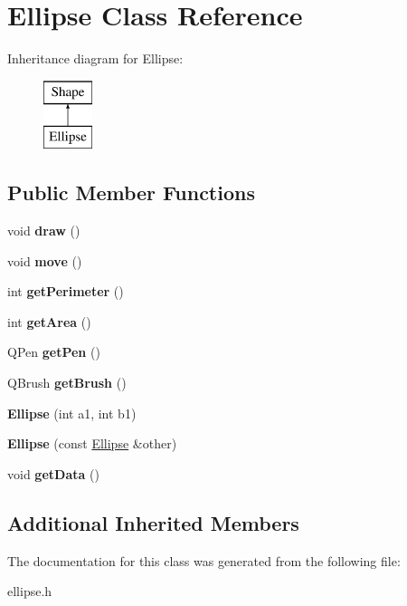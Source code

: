 \hypertarget{class_ellipse}{}\section{Ellipse Class Reference}
\label{class_ellipse}
Inheritance diagram for Ellipse\+:\begin{figure}[H]
\begin{center}
\leavevmode
\includegraphics[height=2.000000cm]{class_ellipse}
\end{center}
\end{figure}
\subsection*{Public Member Functions}
\begin{DoxyCompactItemize}
\item 
\mbox{\label{class_ellipse_a312c0cf0e855dc79d37c07ec52bf202e}} 
void {\bfseries draw} ()
\item 
\mbox{\label{class_ellipse_a143b160178dd490a441ae0aa2ebd1312}} 
void {\bfseries move} ()
\item 
\mbox{\label{class_ellipse_a6d732cab362846f9a796d84af2031c37}} 
int {\bfseries get\+Perimeter} ()
\item 
\mbox{\label{class_ellipse_a8099b7e5018cf1de2ac2b4d08782a5e5}} 
int {\bfseries get\+Area} ()
\item 
\mbox{\label{class_ellipse_a7a785026c16fcdfec458dd4c63f69241}} 
Q\+Pen {\bfseries get\+Pen} ()
\item 
\mbox{\label{class_ellipse_a362fdff0cc4fe3fe4a06febc6f71cccc}} 
Q\+Brush {\bfseries get\+Brush} ()
\item 
\mbox{\label{class_ellipse_aee29fe26c64567b068a4c5b10824ab5c}} 
{\bfseries Ellipse} (int a1, int b1)
\item 
\mbox{\label{class_ellipse_a425c228f8845bb684601f69812775b62}} 
{\bfseries Ellipse} (const \mbox{\hyperlink{class_ellipse}{Ellipse}} \&other)
\item 
\mbox{\label{class_ellipse_a6735ab5f8302ab49001b5d5fa18e69c1}} 
void {\bfseries get\+Data} ()
\end{DoxyCompactItemize}
\subsection*{Additional Inherited Members}


The documentation for this class was generated from the following file\+:\begin{DoxyCompactItemize}
\item 
ellipse.\+h\end{DoxyCompactItemize}
